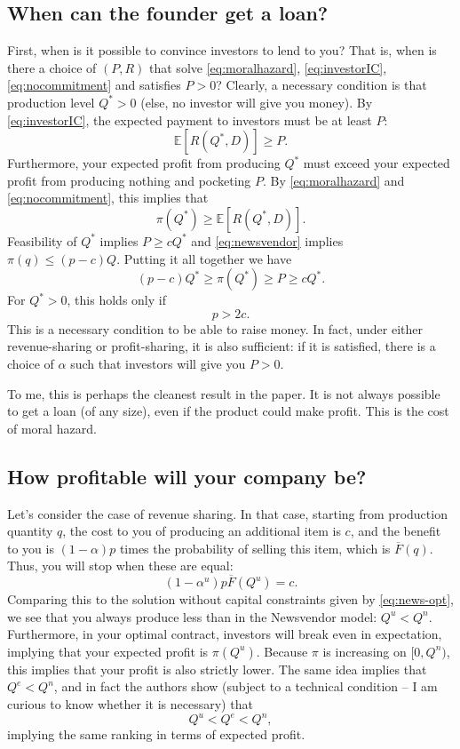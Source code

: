 \documentclass[11pt, oneside]{article}   	%
\newcommand{\E}{\mathbb{E}}
\newcommand{\fbar}{\overline{F}}
\begin{document}
\subsection{When can the founder get a loan?}
First, when is it possible to convince investors to lend to you? That is, when is there a choice of $(P,R)$ that solve \eqref{eq:moralhazard}, \eqref{eq:investorIC}, \eqref{eq:nocommitment} and satisfies $P > 0$?
Clearly, a necessary condition is that production level $Q^* > 0$ (else, no investor will give you money). By \eqref{eq:investorIC}, the expected payment to investors must be at least $P$:
\[ \E[R(Q^*,D)] \geq P.\]
Furthermore, your expected profit from producing $Q^*$ must exceed your expected profit from producing nothing and pocketing $P$. By \eqref{eq:moralhazard} and \eqref{eq:nocommitment}, this implies that
\[\pi(Q^*) \geq \E[R(Q^*,D)] .\]
Feasibility of $Q^*$ implies $P \geq c Q^*$ and  \eqref{eq:newsvendor} implies $\pi(q) \leq (p - c)Q$. Putting it all together we have
\[ (p - c)Q^* \geq \pi(Q^*) \geq P \geq c Q^*.\]
For $Q^* > 0$, this holds only if 
\begin{equation} p > 2 c. \label{eq:necessary} \end{equation}
This is a necessary condition to be able to raise money. In fact, under either revenue-sharing or profit-sharing, it is also sufficient: if it is satisfied, there is a choice of $\alpha$ such that investors will give you $P > 0$.

To me, this is perhaps the cleanest result in the paper. It is not always possible to get a loan (of any size), even if the product could make profit. This is the cost of moral hazard.

\subsection{How profitable will your company be?}

Let's consider the case of revenue sharing. In that case, starting from production quantity $q$, the cost to you of producing an additional item is $c$, and the benefit to you is $(1-\alpha)p$ times the probability of selling this item, which is $\fbar(q)$. Thus, you will stop when these are equal:
\[ (1 - \alpha^u) p\fbar(Q^u) = c.\]
Comparing this to the solution without capital constraints given by \eqref{eq:news-opt}, we see that you always produce less than in the Newsvendor model: $Q^u < Q^n$. Furthermore, in your optimal contract, investors will break even in expectation, implying that your expected profit is $\pi(Q^{u})$. Because $\pi$ is increasing on $[0,Q^n)$, this implies that your profit is also strictly lower. The same idea implies that $Q^e < Q^n$, and in fact the authors show (subject to a technical condition -- I am curious to know whether it is necessary) that 
\[Q^u < Q^e < Q^n,\]
implying the same ranking in terms of expected profit.
\end{document}
